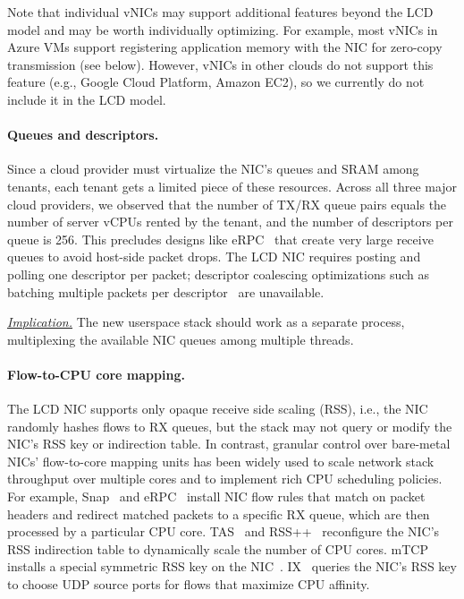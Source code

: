 Note that individual vNICs may support additional features beyond the LCD model and may be worth individually optimizing.
For example, most vNICs in Azure VMs support registering application memory with the NIC for zero-copy transmission (see below).
However, vNICs in other clouds do not support this feature (e.g., Google Cloud Platform, Amazon EC2), so we currently do not include it in the LCD model.

\paragraph{Queues and descriptors.}
Since a cloud provider must virtualize the NIC's queues and SRAM among tenants, each tenant gets a limited piece of these resources.
Across all three major cloud providers, we observed that the number of TX/RX queue pairs equals the number of server vCPUs rented by the tenant, and the number of descriptors per queue is 256.
This precludes designs like eRPC~\cite{erpc} that create very large receive queues to avoid host-side packet drops.
The LCD NIC requires posting and polling one descriptor per packet; descriptor coalescing optimizations such as batching multiple packets per descriptor~\cite{erpc} are unavailable.

\ul{\textit{Implication.}} %
The new userspace stack should work as a separate process, multiplexing the available NIC queues among multiple threads.

\paragraph{Flow-to-CPU core mapping.}
The LCD NIC supports only opaque receive side scaling (RSS), i.e., the NIC randomly hashes flows to RX queues, but the stack may not query or modify the NIC's RSS key or indirection table.
In contrast, granular control over bare-metal NICs' flow-to-core mapping units has been widely used to scale network stack throughput over multiple cores and to implement rich CPU scheduling policies.
For example, Snap~\cite{snap} and eRPC~\cite{erpc} install NIC flow rules that match on packet headers and redirect matched packets to a specific RX queue, which are then processed by a particular CPU core.
TAS~\cite{tas} and RSS++~\cite{rssplusplus} reconfigure the NIC's RSS indirection table to dynamically scale the number of CPU cores.
mTCP~\cite{mtcp} installs a special symmetric RSS key on the NIC~\cite{tas}.
IX~\cite{belay2014ix} queries the NIC's RSS key to choose UDP source ports for flows that maximize CPU affinity.

